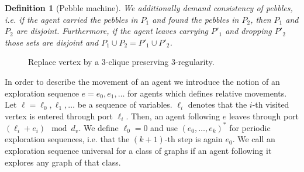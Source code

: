 \documentclass[oneside]{scrartcl}
\newtheorem{definition}{Definition}
\begin{document}
\begin{definition}[Pebble machine]
  We additionally demand consistency of pebbles, i.e. if the agent
  carried the pebbles in $P_{1}$ and found the pebbles in
  $P_{2}$, then $P_{1}$ and $P_{2}$ are disjoint.
  Furthermore, if the agent leaves carrying $P'_{1}$ and dropping $P'_{2}$
  those sets are disjoint and $P_{1}\cup P_{2} = P'_{1}\cup P'_{2}$.
\end{definition}

\begin{wrapfigure}{r}{0.4\textwidth}
  \begin{center}
    \resizebox{0.3\textwidth}{!}{}
  \end{center}
  \caption{Replace vertex by a 3-clique preserving 3-regularity.}
  \label{fig:blowup}
  \vspace{-0.5cm}
\end{wrapfigure}
In order to describe the movement of an agent we introduce the notion of an
exploration sequence $e = e_{0}, e_{1},\dots$ for agents which defines relative
movements.
Let $\ell = \ell_{0},\ell_{1},\dots$ be a sequence of variables.
$\ell_{i}$ denotes that the $i$-th visited vertex is entered through port
$\ell_{i}$. Then, an agent following $e$ leaves through port
$(\ell_{i} + e_{i}) \mod d_{v}$. We define $\ell_{0} = 0$ and use
$(e_{0},\dots,e_{k})^{\ast}$ for periodic exploration sequences, i.e. that
the $(k+1)$-th step is again $e_{0}$. We call an
exploration sequence universal for a class of graphs if an agent following
it explores any graph of that class.
\end{document}
